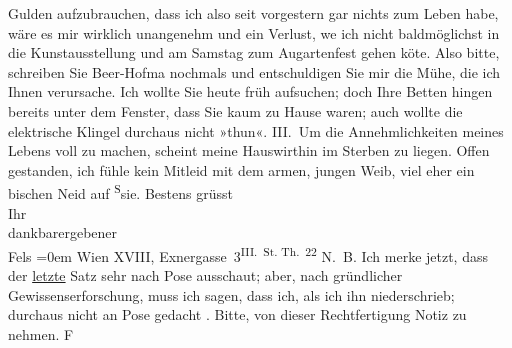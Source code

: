 \begin{ledgroupsized}[t]{13cm}
               Gulden aufzubrauchen, dass ich also seit vorgestern gar nichts zum Leben habe, wäre
               es mir wirklich unangenehm und ein Verlust, we{\geminationn} ich
               nicht baldmöglichst in die Kunstausstellung und am Samstag zum Augartenfest gehen kö{\geminationn}te. Also bitte, schreiben Sie Beer-Hofma{\geminationn} nochmals und entschuldigen Sie mir die Mühe, die ich Ihnen verursache. Ich
               wollte Sie heute früh aufsuchen; doch Ihre Betten hingen bereits {\pb}unter dem Fenster, dass Sie kaum zu Hause waren; auch
               wollte die elektrische Klingel durchaus nicht »thun«.\pend
           \pstart
           III. Um die Annehmlichkeiten meines Lebens voll zu machen, scheint meine Hauswirthin im Sterben zu
               liegen. Offen gestanden, ich fühle kein Mitleid mit dem armen, jungen Weib, viel eher
               ein bischen Neid auf \substVorne{}\textsuperscript{S}\substDazwischen{}s\substHinten{}ie.\pend
           \pstart
           Bestens grüsst{\\[\baselineskip]}Ihr{\\[\baselineskip]}dankbarergebener{\\[\baselineskip]}\spacefill\mbox{Fels}\pend
           \leftskip=0em{}\pstart
           \noindent{}Wien XVIII, Exnergasse 3\textsuperscript{III. St. Th. 22}\pend
           \pstart
           N. B. Ich merke jetzt, dass der \uline{letzte} Satz sehr
                  nach Pose ausschaut; aber, nach gründlicher Gewissenserforschung, muss ich sagen,
                  dass ich, als ich ihn niederschrieb; durchaus nicht an Pose gedacht \label{T_L00326-1v}\label{T_L00326-1h}. Bitte, von dieser
                  Rechtfertigung Notiz zu nehmen. \spacefill\mbox{F}\pend
           
         
         \endnumbering{}\end{ledgroupsized}  \newcommand{\dateiname}{L00326}\newcommand{\titel}{Friedrich M. Fels an Arthur Schnitzler, [17. 5. 1894]}\newcommand{\editorInnen}{Martin Anton Müller und Gerd-Hermann Susen}
      